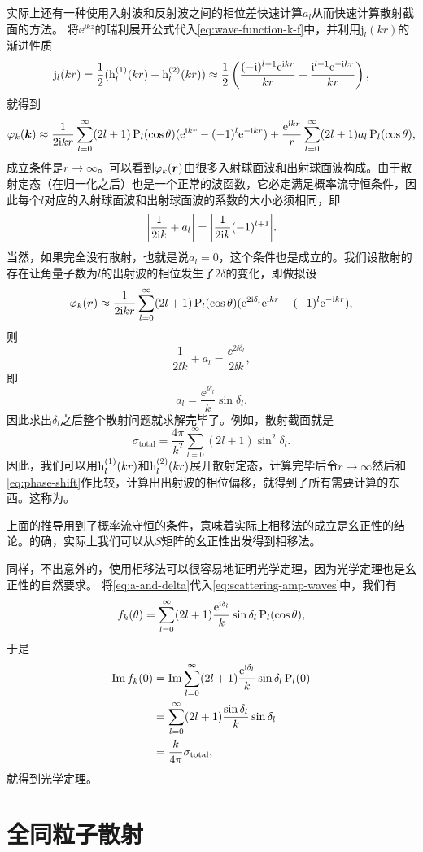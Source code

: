 实际上还有一种使用入射波和反射波之间的相位差快速计算$a_l$从而快速计算散射截面的方法。
将$\ee^{\ii k z}$的瑞利展开公式代入\eqref{eq:wave-function-k-f}中，并利用$\mathrm{j}_l(kr)$的渐进性质
\[
    \mathrm{j}_l(kr) = \frac{1}{2} (\mathrm{h}^{(1)}_l(kr) + \mathrm{h}^{(2)}_l(kr)) \approx \frac{1}{2} \left( \frac{(-\mathrm{i})^{l+1} \mathrm{e}^{\mathrm{i} k r}}{kr} + \frac{\mathrm{i}^{l+1} \mathrm{e}^{- \mathrm{i} k r}}{kr} \right),
\]
就得到
\[
    \varphi_k(\vb*{k}) \approx \frac{1}{2\mathrm{i} k r} \sum_{l=0}^\infty (2l+1) \operatorname{P}_l(\cos \theta) (\mathrm{e}^{\mathrm{i} k r} - (-1)^l \mathrm{e}^{- \mathrm{i} k r}) + \frac{\mathrm{e}^{\mathrm{i} k r}}{r} \sum_{l=0}^\infty (2l+1) a_l \operatorname{P}_l(\cos \theta),
\]
成立条件是$r \to \infty$。可以看到$\varphi_k(\vb*{r})$由很多入射球面波和出射球面波构成。由于散射定态（在归一化之后）也是一个正常的波函数，它必定满足概率流守恒条件，因此每个$l$对应的入射球面波和出射球面波的系数的大小必须相同，即
\[
    \abs{\frac{1}{2\mathrm{i} k} + a_l} = \abs{\frac{1}{2\mathrm{i} k} (-1)^{l+1}}.
\]
当然，如果完全没有散射，也就是说$a_l=0$，这个条件也是成立的。我们设散射的存在让角量子数为$l$的出射波的相位发生了$2\delta$的变化，即做拟设
\begin{equation}
    \varphi_k(\vb*{r}) \approx \frac{1}{2\mathrm{i} k r} \sum_{l=0}^\infty (2l+1) \operatorname{P}_l(\cos \theta) (\mathrm{e}^{2\mathrm{i} \delta_l} \mathrm{e}^{\mathrm{i} k r} - (-1)^l \mathrm{e}^{- \mathrm{i} k r}),
    \label{eq:phase-shift}
\end{equation}
则
\[
    \frac{1}{2\ii k} + a_l = \frac{\ee^{2\ii \delta_l}}{2\ii k},
\]
即
\begin{equation}
    a_l = \frac{\ee^{\ii \delta_l}}{k} \sin \delta_l.
    \label{eq:a-and-delta}
\end{equation}
因此求出$\delta_l$之后整个散射问题就求解完毕了。例如，散射截面就是
\begin{equation}
    \sigma_\text{total} = \frac{4\pi}{k^2} \sum_{l=0}^\infty (2l+1) \sin^2 \delta_l.
\end{equation}
因此，我们可以用$\mathrm{h}^{(1)}_l(kr)$和$\mathrm{h}^{(2)}_l(kr)$展开散射定态，计算完毕后令$r\to \infty$然后和\eqref{eq:phase-shift}作比较，计算出出射波的相位偏移，就得到了所有需要计算的东西。这称为。

上面的推导用到了概率流守恒的条件，意味着实际上相移法的成立是幺正性的结论。的确，实际上我们可以从$S$矩阵的幺正性出发得到相移法。

同样，不出意外的，使用相移法可以很容易地证明光学定理，因为光学定理也是幺正性的自然要求。
将\eqref{eq:a-and-delta}代入\eqref{eq:scattering-amp-waves}中，我们有
\[
    f_k(\theta) = \sum_{l=0}^\infty (2l+1) \frac{\mathrm{e}^{\mathrm{i} \delta_l}}{k} \sin \delta_l \operatorname{P}_l(\cos \theta),
\]
于是
\[
    \begin{aligned}
        \Im f_k(0) &= \Im \sum_{l=0}^\infty (2l+1) \frac{\mathrm{e}^{\mathrm{i} \delta_l}}{k} \sin \delta_l \operatorname{P}_l(0) \\
        &= \sum_{l=0}^\infty (2l+1) \frac{\sin \delta_l}{k} \sin \delta_l \\
        &= \frac{k}{4\pi} \sigma_\text{total},
    \end{aligned}
\]
就得到光学定理。

\section{全同粒子散射}
